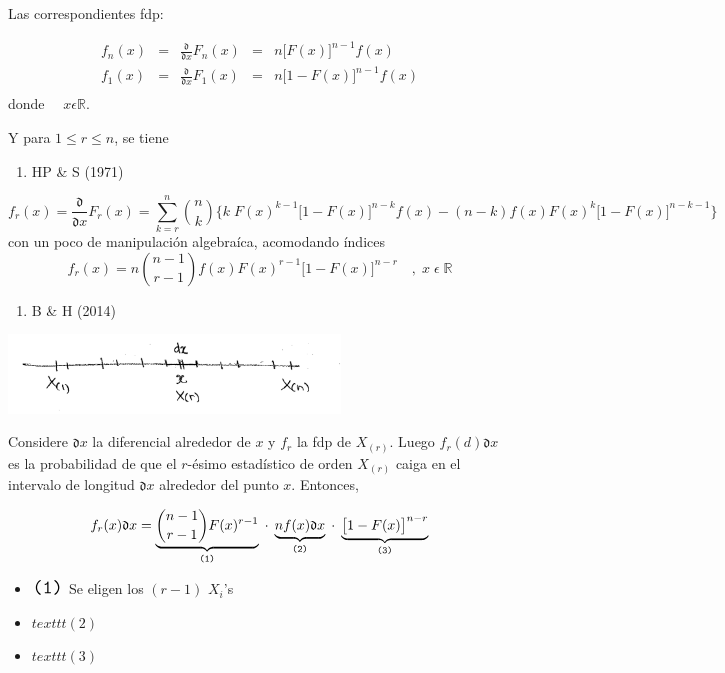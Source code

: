 \documentclass[]{book}
\providecommand{\tightlist}{%
  \setlength{\itemsep}{0pt}\setlength{\parskip}{0pt}}
\begin{document}
Las correspondientes fdp:

\[
\begin{array}{ccccl}
f_n(x) & = &  \frac{\mathfrak{d}}{\mathfrak{d}x}F_n(x) & = & n\big[ F(x) \big]^{n-1}f(x)\\
f_1(x) & = &  \frac{\mathfrak{d}}{\mathfrak{d}x}F_1(x) & = & n\big[ 1- F(x)\big]^{n-1}f(x)  \\
\end{array}
\]
donde \(\quad x \epsilon \mathbb{R}\).

Y para \(1 \leq r \leq n\), se tiene

\begin{enumerate}
\def\labelenumi{\alph{enumi})}
\tightlist
\item
  HP \& S (1971)
\end{enumerate}

\[
f_r(x)  =   
\frac{\mathfrak{d}}{\mathfrak{d}x}F_r(x)  = 
\sum_{k =r}^n {n \choose k} 
\Big\{   
k \; F(x)^{k-1} \big[ 1 - F(x)\big]^{n-k}f(x) - (n-k)f(x)F(x)^k \big[ 1 - F(x)\big]^{n-k-1}
\Big\}
\]
con un poco de manipulación algebraíca, acomodando índices
\[
f_r(x)  =   
n {n-1 \choose r-1} 
f(x) F(x)^{r-1} \big[ 1 - F(x)\big]^{n-r} \quad ,\; x \; \epsilon \; \mathbb{R}
\]

\begin{enumerate}
\def\labelenumi{\alph{enumi})}
\setcounter{enumi}{1}
\tightlist
\item
  B \& H (2014)
\end{enumerate}

\begin{center}\includegraphics[width=250pt]{imgs/estadord_bh} \end{center}

Considere \(\mathfrak{d}x\) la diferencial alrededor de \(x\) y \(f_r\) la fdp de \(X_{(r)}\). Luego \(f_r(d)\mathfrak{d}x\) es la probabilidad de que el \(r\)-ésimo estadístico de orden \(X_{(r)}\) caiga en el intervalo de longitud \(\mathfrak{d}x\) alrededor del punto \(x\). Entonces,

\[
f_r(x)\mathfrak{d}x  = 
\underbrace{ {n-1 \choose r-1} F(x)^{r-1} }_{ \Large{ \texttt{(1)}} } \;\cdot\;
\underbrace{ nf(x)\mathfrak{d}x }_{ \Large{\texttt{(2)}} } \;\cdot\;
\underbrace{ \big[1 - F(x)\big]^{n-r} }_{ \Large{\texttt{(3)}} } 
\]

\begin{itemize}
\item
  \(\Large{ \texttt{(1)}}\) Se eligen los \((r-1)\) \(X_i\)'s
\item
  \(texttt{(2)}\)
\item
  \(texttt{(3)}\)
\end{itemize}






\tableofcontents
\end{document}

